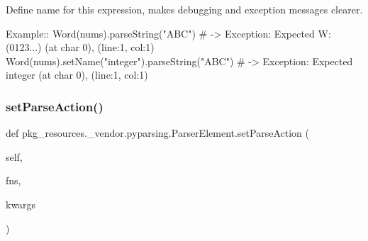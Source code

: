 \begin{DoxyVerb}Define name for this expression, makes debugging and exception messages clearer.

Example::
    Word(nums).parseString("ABC")  # -> Exception: Expected W:(0123...) (at char 0), (line:1, col:1)
    Word(nums).setName("integer").parseString("ABC")  # -> Exception: Expected integer (at char 0), (line:1, col:1)
\end{DoxyVerb}
 \mbox{\label{classpkg__resources_1_1__vendor_1_1pyparsing_1_1_parser_element_a4fc9391373f5434729bec5a5440a2788}} 
\subsubsection{\texorpdfstring{set\+Parse\+Action()}{setParseAction()}}
{\footnotesize\ttfamily def pkg\+\_\+resources.\+\_\+vendor.\+pyparsing.\+Parser\+Element.\+set\+Parse\+Action (\begin{DoxyParamCaption}\item[{}]{self,  }\item[{}]{fns,  }\item[{}]{kwargs }\end{DoxyParamCaption})}

